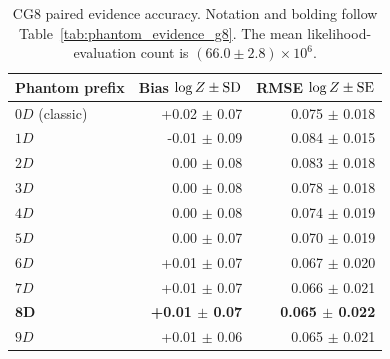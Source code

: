 \documentclass[pdflatex,sn-basic,icol]{sn-jnl}
\theoremstyle{plain}
\theoremstyle{definition}
\begin{document}
\begin{table}[t]
\caption{CG8 paired evidence accuracy. Notation and bolding follow Table~\ref{tab:phantom_evidence_g8}. The mean likelihood-evaluation count is $(66.0\pm2.8)\times10^6$.}
\label{tab:phantom_evidence_cg8}
\centering
\scriptsize
\setlength{\tabcolsep}{3.0pt}
\renewcommand{\arraystretch}{0.92}
\begin{tabular}{lrr}
\toprule
Phantom prefix & Bias $\log Z\mathbin{\pm}{\rm SD}$ & RMSE $\log Z\mathbin{\pm}{\rm SE}$ \\
\midrule
$0D$ (classic) & +0.02 $\pm$ 0.07 & 0.075 $\pm$ 0.018 \\
$1D$ & -0.01 $\pm$ 0.09 & 0.084 $\pm$ 0.015 \\
$2D$ & 0.00 $\pm$ 0.08 & 0.083 $\pm$ 0.018 \\
$3D$ & 0.00 $\pm$ 0.08 & 0.078 $\pm$ 0.018 \\
$4D$ & 0.00 $\pm$ 0.08 & 0.074 $\pm$ 0.019 \\
$5D$ & 0.00 $\pm$ 0.07 & 0.070 $\pm$ 0.019 \\
$6D$ & +0.01 $\pm$ 0.07 & 0.067 $\pm$ 0.020 \\
$7D$ & +0.01 $\pm$ 0.07 & 0.066 $\pm$ 0.021 \\
$\boldsymbol{8D}$ & \textbf{+0.01 $\pm$ 0.07} & \textbf{0.065 $\pm$ 0.022} \\
$9D$ & +0.01 $\pm$ 0.06 & 0.065 $\pm$ 0.021 \\
\bottomrule
\end{tabular}
\end{table}
\end{document}
